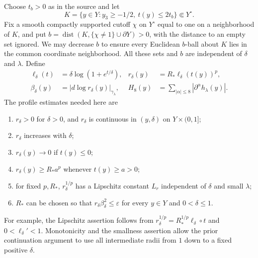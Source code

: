 \documentclass[11pt]{article}
\theoremstyle{definition}
\theoremstyle{remark}
\numberwithin{equation}{section}
\begin{document}
Choose $t_b>0$ as in the source and let
\[
 K=\{y\in Y:y_3\geq-1/2,\ t(y)\leq2t_b\}\Subset Y^\circ.
\]
Fix a smooth compactly supported cutoff $\chi$ on $Y^\circ$ equal to
one on a neighborhood of $K$, and put
$b=\operatorname{dist}(K,\{\chi\ne1\}\cup\partial Y)>0$,
with the distance to an empty set ignored.  We may decrease $b$ to
ensure every Euclidean $b$-ball about $K$ lies in the common coordinate
neighborhood.  All these sets and $b$ are independent of $\delta$ and
$\lambda$.  Define
\begin{align*}
 \ell_\delta(t)&=\delta\log(1+e^{t/\delta}),&
 r_\delta(y)&=R_*\ell_\delta(t(y))^p,\\
 \beta_\delta(y)&=|d\log r_\delta(y)|_{\gamma_\lambda},&
 H_8(y)&=\sum_{|\alpha|\leq8}|\partial^\alpha h_\lambda(y)|.
\end{align*}
The profile estimates needed here are
\begin{enumerate}
 \item $r_\delta>0$ for $\delta>0$, and $r_\delta$ is continuous in
       $(y,\delta)$ on $Y\times(0,1]$;
 \item $r_\delta$ increases with $\delta$;
 \item $r_\delta(y)\to0$ if $t(y)\leq0$;
 \item $r_\delta(y)\geq R_*a^p$ whenever $t(y)\geq a>0$;
 \item for fixed $p,R_*$, $r_\delta^{1/p}$ has a Lipschitz constant
       $L_r$ independent of $\delta$ and small $\lambda$;
 \item $R_*$ can be chosen so that
       $r_\delta\beta_\delta^2\leq\varepsilon$ for every
       $y\in Y$ and $0<\delta\leq1$.
\end{enumerate}
For example, the Lipschitz assertion follows from
$r_\delta^{1/p}=R_*^{1/p}\ell_\delta\circ t$ and
$0<\ell_\delta'<1$.  Monotonicity and the smallness assertion allow the
prior continuation argument to use all intermediate radii from $1$
down to a fixed positive $\delta$.
\end{document}
